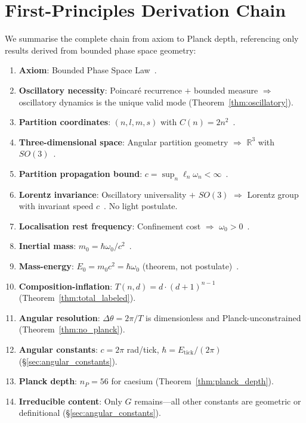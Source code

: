 \documentclass[twocolumn,10pt,a4paper]{article}
\theoremstyle{definition}
\theoremstyle{remark}
\begin{document}
\section{First-Principles Derivation Chain}
\label{sec:derivation_chain}

We summarise the complete chain from axiom to Planck depth, referencing only results derived from bounded phase space geometry:

\begin{enumerate}
\item \textbf{Axiom}: Bounded Phase Space Law~\cite{sachikonye2025bounded}.
\item \textbf{Oscillatory necessity}: Poincar\'{e} recurrence $+$ bounded measure $\Rightarrow$ oscillatory dynamics is the unique valid mode (Theorem~\ref{thm:oscillatory}).
\item \textbf{Partition coordinates}: $(n, l, m, s)$ with $C(n) = 2n^2$~\cite{sachikonye2025bounded}.
\item \textbf{Three-dimensional space}: Angular partition geometry $\Rightarrow$ $\mathbb{R}^3$ with $SO(3)$~\cite{sachikonye2025ion}.
\item \textbf{Partition propagation bound}: $c = \sup_n \ell_n\omega_n < \infty$~\cite{sachikonye2025ion}.
\item \textbf{Lorentz invariance}: Oscillatory universality $+$ $SO(3)$ $\Rightarrow$ Lorentz group with invariant speed $c$~\cite{sachikonye2025ion}. No light postulate.
\item \textbf{Localisation rest frequency}: Confinement cost $\Rightarrow$ $\omega_0 > 0$~\cite{sachikonye2025ion}.
\item \textbf{Inertial mass}: $m_0 = \hbar\omega_0/c^2$~\cite{sachikonye2025ion}.
\item \textbf{Mass-energy}: $E_0 = m_0c^2 = \hbar\omega_0$ (theorem, not postulate)~\cite{sachikonye2025ion}.
\item \textbf{Composition-inflation}: $T(n,d) = d \cdot (d+1)^{n-1}$ (Theorem~\ref{thm:total_labeled}).
\item \textbf{Angular resolution}: $\Delta\theta = 2\pi/T$ is dimensionless and Planck-unconstrained (Theorem~\ref{thm:no_planck}).
\item \textbf{Angular constants}: $c = 2\pi$ rad/tick, $\hbar = E_{\text{tick}}/(2\pi)$ (\S\ref{sec:angular_constants}).
\item \textbf{Planck depth}: $n_P = 56$ for caesium (Theorem~\ref{thm:planck_depth}).
\item \textbf{Irreducible content}: Only $G$ remains---all other constants are geometric or definitional (\S\ref{sec:angular_constants}).
\end{enumerate}
\end{document}
